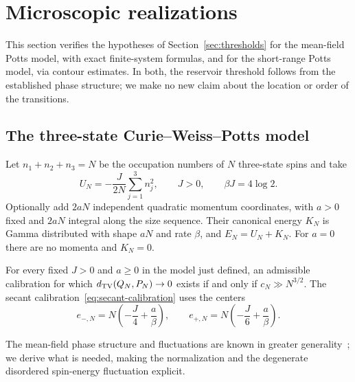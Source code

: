 \section{Microscopic realizations}
\label{sec:microscopic}

This section verifies the hypotheses of Section~\ref{sec:thresholds}
for the mean-field Potts model, with exact finite-system formulas, and
for the short-range Potts model, via contour estimates. In both, the
reservoir threshold follows from the established phase structure; we
make no new claim about the location or order of the transitions.

\subsection{The three-state Curie--Weiss--Potts model}
\label{subsec:meanfield}

Let $n_1+n_2+n_3=N$ be the occupation numbers of $N$ three-state spins and
take
\begin{equation}
 U_N=-\frac{J}{2N}\sum_{j=1}^3n_j^2,\qquad J>0,
 \qquad \beta J=4\log2.
 \label{eq:mf-hamiltonian}
\end{equation}
Optionally add $2aN$ independent quadratic momentum coordinates, with
$a>0$ fixed and $2aN$ integral along the size sequence. Their canonical
energy $K_N$ is Gamma distributed with shape $aN$ and rate $\beta$, and
$E_N=U_N+K_N$. For $a=0$ there are no momenta and $K_N=0$.

\begin{theorem}
\label{thm:mf-bath}
For every fixed $J>0$ and $a\ge0$ in the model just defined, an admissible
calibration for which $d_{\mathrm{TV}}(Q_N,P_N)\to0$ exists if and only if
$c_N\gg N^{3/2}$. The secant calibration~\eqref{eq:secant-calibration}
uses the centers
\begin{equation}
 e_{-,N}=N\left(-\frac J4+\frac a\beta\right),\qquad
 e_{+,N}=N\left(-\frac J6+\frac a\beta\right).
 \label{eq:mf-centers}
\end{equation}
\end{theorem}

The mean-field phase structure and fluctuations are known in greater
generality~\cite{CosteniucEllisTouchette2005,GandolfoRuizWouts2010};
we derive what is needed, making the normalization and the degenerate
disordered spin-energy fluctuation explicit.

